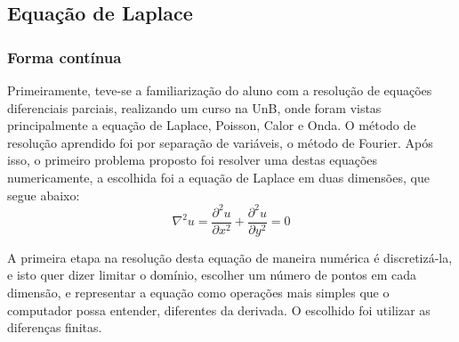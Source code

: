 \documentclass[journal]{IEEEtran}
\begin{document}
\subsection{Equação de Laplace}
\subsubsection{Forma contínua}
Primeiramente, teve-se a familiarização do aluno com a resolução de equações diferenciais parciais, realizando um curso na UnB, onde foram vistas principalmente a equação de Laplace, Poisson, Calor e Onda. O método de resolução aprendido foi por separação de variáveis, o método de Fourier. Após isso, o primeiro problema proposto foi resolver uma destas equações numericamente, a escolhida foi a equação de Laplace em duas dimensões, que segue abaixo:
\begin{equation}
\nabla^2 u=\frac{\partial^2 u}{\partial x^2}+\frac{\partial^2 u}{\partial y^2}=0\label{laplace}
\end{equation}

A primeira etapa na resolução desta equação de maneira numérica é discretizá-la, e isto quer dizer limitar o domínio, escolher um número de pontos em cada dimensão, e representar a equação como operações mais simples que o computador possa entender, diferentes da derivada. O escolhido foi utilizar as diferenças finitas.
\end{document}
